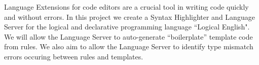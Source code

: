 \documentclass[../main.tex]{subfiles}
\begin{document}
Language Extensions for code editors are a crucial tool in writing code quickly and without errors. In this project we create a Syntax Highlighter and Language Server for the logical and declarative programming language ``Logical English". We will allow the Language Server to auto-generate ``boilerplate'' template code from rules. We also aim to allow the Language Server to identify type mismatch errors occuring between rules and templates.
\end{document}
